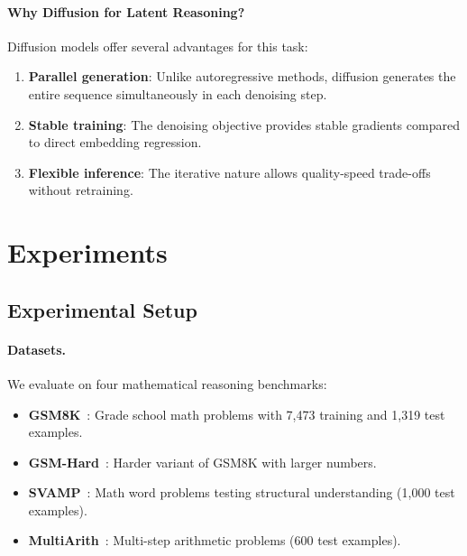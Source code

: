 \documentclass{article}
\begin{document}
\paragraph{Why Diffusion for Latent Reasoning?}
Diffusion models offer several advantages for this task:
\begin{enumerate}
    \item \textbf{Parallel generation}: Unlike autoregressive methods, diffusion generates the entire sequence simultaneously in each denoising step.
    \item \textbf{Stable training}: The denoising objective provides stable gradients compared to direct embedding regression.
    \item \textbf{Flexible inference}: The iterative nature allows quality-speed trade-offs without retraining.
\end{enumerate}

\section{Experiments}
\label{sec:experiments}

\subsection{Experimental Setup}
\label{sec:setup}

\paragraph{Datasets.}
We evaluate on four mathematical reasoning benchmarks:
\begin{itemize}
    \item \textbf{GSM8K}~\citep{cobbe2021training}: Grade school math problems with 7,473 training and 1,319 test examples.
    \item \textbf{GSM-Hard}~\citep{gao2023pal}: Harder variant of GSM8K with larger numbers.
    \item \textbf{SVAMP}~\citep{patel2021nlp}: Math word problems testing structural understanding (1,000 test examples).
    \item \textbf{MultiArith}~\citep{roy2016solving}: Multi-step arithmetic problems (600 test examples).
\end{itemize}
\end{document}
